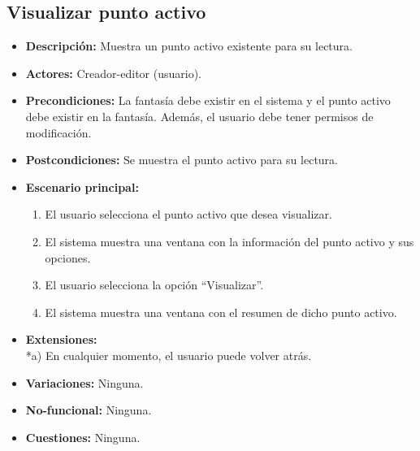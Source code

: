 \subsection{Visualizar punto activo}
\begin{itemize}
	\item \textbf{Descripción:} Muestra un punto activo existente para su lectura.
	\item \textbf{Actores:} Creador-editor (usuario).
	\item \textbf{Precondiciones:} La fantasía debe existir en el sistema y el punto activo debe existir en la fantasía. Además, el usuario debe tener permisos de modificación.
	\item \textbf{Postcondiciones:} Se muestra el punto activo para su lectura.
	\item \textbf{Escenario principal:}
	\begin{enumerate}
		\item El usuario selecciona el punto activo que desea visualizar.
		\item El sistema muestra una ventana con la información del punto activo y sus opciones.
		\item El usuario selecciona la opción ``Visualizar''.
		\item El sistema muestra una ventana con el resumen de dicho punto activo.
	\end{enumerate}
	\item \textbf{Extensiones:} \\ *a) En cualquier momento, el usuario puede volver atrás.
	\item \textbf{Variaciones:} Ninguna.
	\item \textbf{No-funcional:} Ninguna.
	\item \textbf{Cuestiones:} Ninguna.
\end{itemize}


